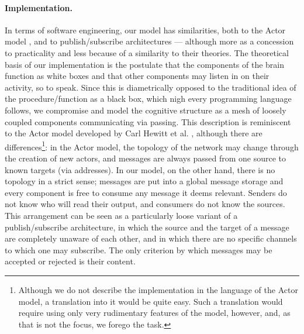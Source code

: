 \paragraph{Implementation.} In terms of software engineering, our model has similarities, both to the Actor model \cite{hewittActor}, and to publish/subscribe architectures \cite{publishSubscribe} --- although more as a concession to practicality and less because of a similarity to their theories. The theoretical basis of our implementation is the postulate that the components of the brain function as white boxes and that other components may listen in on their activity, so to speak. Since this is diametrically opposed to the traditional idea of the procedure/function as a black box, which nigh every programming language follows, we compromise and model the cognitive structure as a mesh of loosely coupled components communicating via passing. This description is reminiscent to the Actor model developed by Carl Hewitt et al. , although there are differences\footnote{Although we do not describe the implementation in the language of the Actor model, a translation into it would be quite easy. Such a translation would require using only very rudimentary features of the model, however, and, as that is not the focus, we forego the task.}: in the Actor model, the topology of the network may change through the creation of new actors, and messages are always passed from one source to known targets (via addresses). In our model, on the other hand, there is no topology in a strict sense; messages are put into a global message storage and every component is free to consume any message it deems relevant. Senders do not know who will read their output, and consumers do not know the sources. This arrangement can be seen as a particularly loose variant of a publish/subscribe architecture, in which the source and the target of a message are completely unaware of each other, and in which there are no specific channels to which one may subscribe. The only criterion by which messages may be accepted or rejected is their content.


